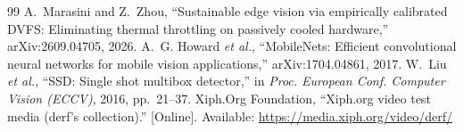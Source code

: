 \documentclass[conference]{IEEEtran}
\begin{document}
\begin{thebibliography}{99}
 A.~Marasini and Z.~Zhou, ``Sustainable edge vision via empirically calibrated DVFS: Eliminating thermal throttling on passively cooled hardware,'' arXiv:2609.04705, 2026.
 A.~G. Howard \textit{et al.}, ``MobileNets: Efficient convolutional neural networks for mobile vision applications,'' arXiv:1704.04861, 2017.
 W.~Liu \textit{et al.}, ``SSD: Single shot multibox detector,'' in \textit{Proc. European Conf. Computer Vision (ECCV)}, 2016, pp.~21--37.
 Xiph.Org Foundation, ``Xiph.org video test media (derf's collection).'' [Online]. Available: \url{https://media.xiph.org/video/derf/}
\end{thebibliography}
\end{document}
